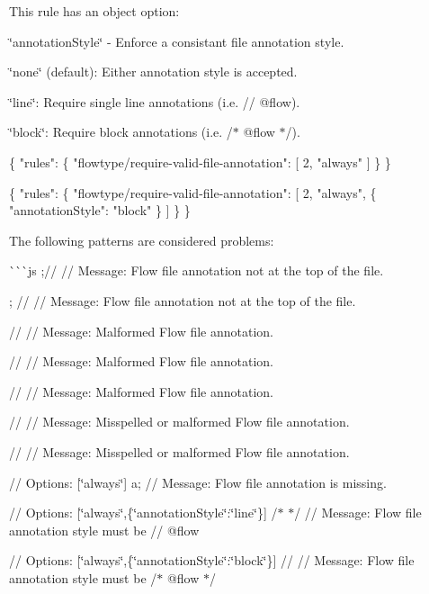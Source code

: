 This rule has an object option\+:


\begin{DoxyItemize}
\item {\ttfamily \char`\"{}annotation\+Style\char`\"{}} -\/ Enforce a consistant file annotation style.
\begin{DoxyItemize}
\item {\ttfamily \char`\"{}none\char`\"{}} (default)\+: Either annotation style is accepted.
\item {\ttfamily \char`\"{}line\char`\"{}}\+: Require single line annotations (i.\+e. {\ttfamily // @flow}).
\item {\ttfamily \char`\"{}block\char`\"{}}\+: Require block annotations (i.\+e. {\ttfamily /$\ast$ @flow $\ast$/}).
\end{DoxyItemize}
\end{DoxyItemize}


\begin{DoxyCode}
\{
  "rules": \{
    "flowtype/require-valid-file-annotation": [
      2,
      "always"
    ]
  \}
\}

\{
  "rules": \{
    "flowtype/require-valid-file-annotation": [
      2,
      "always", \{
        "annotationStyle": "block"
      \}
    ]
  \}
\}
\end{DoxyCode}


The following patterns are considered problems\+:

\`{}\`{}\`{}js ;//  // Message\+: Flow file annotation not at the top of the file.

; //  // Message\+: Flow file annotation not at the top of the file.

//  // Message\+: Malformed Flow file annotation.

//  // Message\+: Malformed Flow file annotation.

//  // Message\+: Malformed Flow file annotation.

//  // Message\+: Misspelled or malformed Flow file annotation.

//  // Message\+: Misspelled or malformed Flow file annotation.

// Options\+: \mbox{[}\char`\"{}always\char`\"{}\mbox{]} a; // Message\+: Flow file annotation is missing.

// Options\+: \mbox{[}\char`\"{}always\char`\"{},\{\char`\"{}annotation\+Style\char`\"{}\+:\char`\"{}line\char`\"{}\}\mbox{]} /$\ast$  $\ast$/ // Message\+: Flow file annotation style must be {\ttfamily // @flow}

// Options\+: \mbox{[}\char`\"{}always\char`\"{},\{\char`\"{}annotation\+Style\char`\"{}\+:\char`\"{}block\char`\"{}\}\mbox{]} //  // Message\+: Flow file annotation style must be {\ttfamily /$\ast$ @flow $\ast$/}


